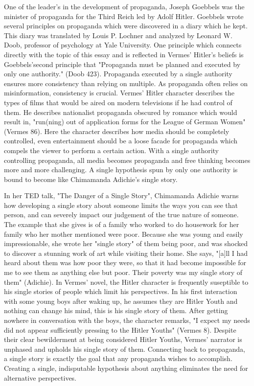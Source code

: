 \documentclass[12pt]{article}
\begin{document}
One of the leader's in the development of propaganda, Joseph Goebbels was the minister of propaganda for the
Third Reich led by Adolf Hitler. Goebbels wrote several principles on propaganda which were discovered in a
diary which he kept. This diary was translated by Louis P. Lochner and analyzed by Leonard W. Doob, professor of 
psychology at Yale University. One principle which connects directly with the topic of this essay and is
reflected in Vermes' Hitler's beliefs is Goebbels'second principle that "Propaganda must be planned and
executed by only one authority." (Doob 423). Propaganda executed by a single authority ensures more
consistency than relying on multiple. As propaganda often relies on misinformation, consistency is crucial.
Vermes' Hitler character describes the types of films that would be aired on modern televisions if he had control of 
them. He describes nationalist propaganda obscured by romance which would result in, "run(ning) out of application forms
for the League of German Women" (Vermes 86). Here the character describes how media should be completely controlled,
even entertainment should be a loose facade for propaganda which compels the viewer to perform a certain action.
With a single authority controlling propaganda, all media becomes propaganda and free thinking becomes more and more
challenging. A single hypothesis spun by only one authority is bound to become like Chimamanda Adichie's single story.

In her TED talk, "The Danger of a Single Story", Chimamanda Adichie warns how developing a single story about
someone limits the ways you can see that person, and can severely impact our judgement of the true nature of someone. 
The example that she gives is of a family who worked to do housework for her family who her mother mentioned were poor.
Because she was young and easily impressionable, she wrote her "single story" of them being poor, and was shocked to 
discover a stunning work of art while visiting their home. She says, "[a]ll I had heard about them was how poor they were,
so that it had become impossible for me to see them as anything else but poor.
Their poverty was my single story of them" (Adichie). In Vermes' novel, the Hitler character is frequently suseptible to
his single stories of people which limit his perspectives. In his first interaction with some young boys after waking up,
he assumes they are Hitler Youth and nothing can change his mind, this is his single story of them. After getting nowhere
in conversation with the boys, the character remarks, "I expect my needs did not appear sufficiently pressing to the 
Hitler Youths" (Vermes 8). Despite their clear bewilderment at being considered Hitler Youths, Vermes' narrator is unphased
and upholds his single story of them. Connecting back to propaganda, a single story is exactly the goal that any propaganda
wishes to accomplish. Creating a single, indisputable hypothesis about anything eliminates the need for alternative perspectives.
\end{document}
